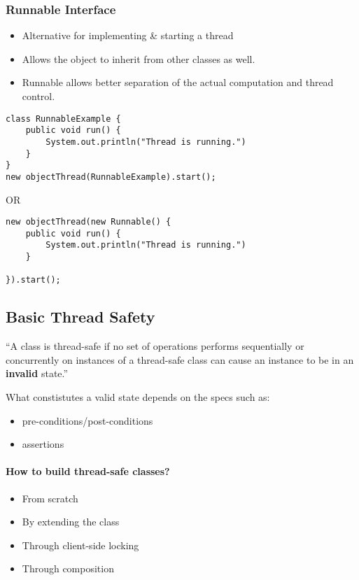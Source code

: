 \documentclass[a4paper]{article}
\begin{document}
\subsubsection{Runnable Interface}
\begin{itemize}
	\item Alternative for implementing \& starting a thread
	\item Allows the object to inherit from other classes as well.
	\item Runnable allows better separation of the actual computation and thread control.
\end{itemize}
\begin{verbatim}
class RunnableExample {
	public void run() {
		System.out.println("Thread is running.")
	}
}
new objectThread(RunnableExample).start();
\end{verbatim}
OR
\\
\begin{verbatim}
new objectThread(new Runnable() {
	public void run() {
		System.out.println("Thread is running.")
	}

}).start();
\end{verbatim}
\newpage
\subsection{Basic Thread Safety}
\begin{displayquote}
	“A class is thread-safe if no set of operations performs sequentially or concurrently on instances of a thread-safe class can cause an instance to be in an \textbf{invalid} state.”
\end{displayquote}
What constistutes a valid state depends on the specs such as:
\begin{itemize}
	\item pre-conditions/post-conditions
	\item assertions
\end{itemize}
\paragraph{How to build thread-safe classes?}
\begin{itemize}
	\item From scratch
	\item By extending the class
	\item Through client-side locking
	\item Through composition
\end{itemize}
\end{document}
